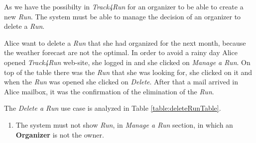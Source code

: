 As we have the possibilty in \textit{Track4Run} for an organizer to be able to create a new \textit{Run}. The system must be able to manage the decision of an organizer to delete a \textit{Run}.

Alice want to delete a \textit{Run} that she had organized for the next month, because the weather forecast are not the optimal.
In order to avoid a rainy day Alice opened \textit{Track4Run} web-site, she logged in and she clicked on \textit{Manage a Run}.
On top of the table there was the \textit{Run} that she was looking for, she clicked on it and when the \textit{Run} was opened she clicked on \textit{Delete}.
After that a mail arrived in Alice mailbox, it was the confirmation of the elimination of the \textit{Run}.

The \textit{Delete a Run} use case is analyzed in Table \ref{table:deleteRunTable}.

\begin{enumerate}
  \item The system must not show \textit{Run}, in \textit{Manage a Run} section, in which an \textbf{Organizer} is not the owner.
\end{enumerate}

